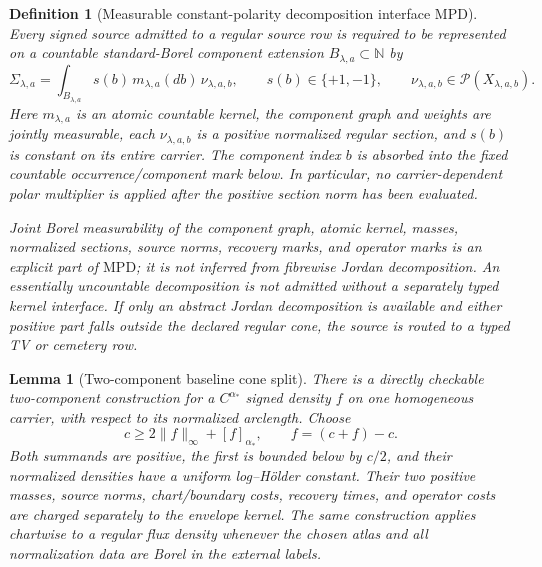 \documentclass[11pt]{article}
\newtheorem{lemma}[theorem]{Lemma}
\newtheorem{definition}[theorem]{Definition}
\begin{document}
\begin{definition}[Measurable constant-polarity decomposition interface
$\mathrm{MPD}$]
\label{lem:measurable-positive-decomposition}
Every signed source admitted to a regular source row is required to be
represented on
a countable standard-Borel component extension
$B_{\lambda,a}\subset\mathbb N$ by
\begin{equation}
\label{eq:measurable-positive-decomposition}
 \Sigma_{\lambda,a}
 =\int_{B_{\lambda,a}}s(b)\,m_{\lambda,a}(db)\,
       \nu_{\lambda,a,b},
 \qquad s(b)\in\{+1,-1\},\qquad
 \nu_{\lambda,a,b}\in\mathcal P(X_{\lambda,a,b}).
\end{equation}
Here $m_{\lambda,a}$ is an atomic countable kernel, the component graph and
weights are jointly measurable, each
$\nu_{\lambda,a,b}$ is a positive normalized regular section, and $s(b)$ is
constant on its entire carrier.  The component index $b$ is absorbed into
the fixed countable occurrence/component mark below.  In particular, no
carrier-dependent polar multiplier is applied after the positive section
norm has been evaluated.

Joint Borel measurability of the component graph, atomic kernel, masses,
normalized sections, source norms, recovery marks, and operator marks is an
explicit part of $\mathrm{MPD}$; it is not inferred from fibrewise Jordan
decomposition.  An essentially uncountable decomposition is not admitted
without a separately typed kernel interface.  If only an abstract Jordan
decomposition is available and either positive part falls outside the
declared regular cone, the source is routed to a typed TV or cemetery row.
\end{definition}

\begin{lemma}[Two-component baseline cone split]
\label{lem:baseline-cone-split}
There is a directly checkable two-component construction for a
$C^{\alpha_*}$ signed density $f$ on one homogeneous carrier, with respect
to its normalized arclength.  Choose
\begin{equation}
\label{eq:baseline-cone-split}
 c\ge 2\|f\|_\infty+[f]_{\alpha_*},
 \qquad f=(c+f)-c.
\end{equation}
Both summands are positive, the first is bounded below by $c/2$, and their
normalized densities have a uniform log--H\"older constant.  Their two
positive masses, source norms, chart/boundary costs, recovery times, and
operator costs are charged separately to the envelope kernel.  The same
construction applies chartwise to a regular flux density whenever the
chosen atlas and all normalization data are Borel in the external labels.
\end{lemma}
\end{document}
